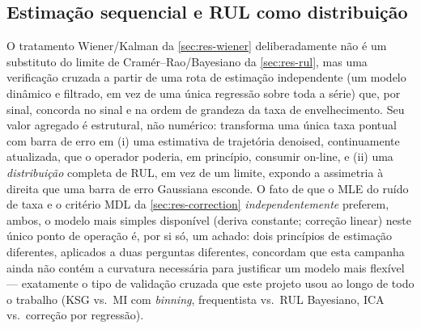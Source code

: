 \subsection{Estimação sequencial e RUL como distribuição}
O tratamento Wiener/Kalman da \cref{sec:res-wiener} deliberadamente não é um
substituto do limite de Cram\'er--Rao/Bayesiano da \cref{sec:res-rul}, mas
uma verificação cruzada a partir de uma rota de estimação independente (um
modelo dinâmico e filtrado, em vez de uma única regressão sobre toda a
série) que, por sinal, concorda no sinal e na ordem de grandeza da taxa de
envelhecimento. Seu valor agregado é estrutural, não numérico: transforma
uma única taxa pontual com barra de erro em (i) uma estimativa de
trajetória denoised, continuamente atualizada, que o operador poderia, em
princípio, consumir on-line, e (ii) uma \emph{distribuição} completa de RUL,
em vez de um limite, expondo a assimetria à direita que uma barra de erro
Gaussiana esconde. O fato de que o MLE do ruído de taxa e o critério MDL da
\cref{sec:res-correction} \emph{independentemente} preferem, ambos, o modelo
mais simples disponível (deriva constante; correção linear) neste único
ponto de operação é, por si só, um achado: dois princípios de estimação
diferentes, aplicados a duas perguntas diferentes, concordam que esta
campanha ainda não contém a curvatura necessária para justificar um modelo
mais flexível --- exatamente o tipo de validação cruzada que este projeto
usou ao longo de todo o trabalho (KSG vs.\ MI com \emph{binning},
frequentista vs.\ RUL Bayesiano, ICA vs.\ correção por regressão).

